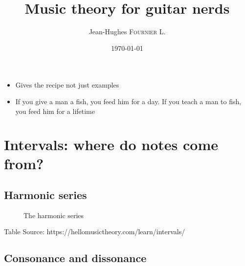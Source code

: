 \documentclass{article}
\title{ Music theory for guitar nerds  } %
\author{ Jean-Hughes \textsc{Fournier L.} } %
\date{\today} %
\begin{document}
\maketitle %
\newpage
\tableofcontents
\newpage

\begin{itemize}
	\item Gives the recipe not just examples
	\item If you give a man a fish, you feed him for a day. If you teach a man to fish, you feed him for a lifetime
\end{itemize}

\section{Intervals: where do notes come from?}


\subsection{Harmonic series}

\begin{figure}[h!]
	\centering
	\scalebox{1}{}
	\caption{The harmonic series}
	\label{fig:serie_harmonique}
\end{figure}




 Table
 Source: https://hellomusictheory.com/learn/intervals/



\subsection{Consonance and dissonance}
\end{document}
